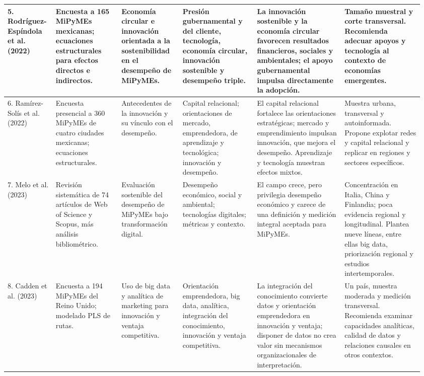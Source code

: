 \documentclass[spanish,letterpaper,oneside]{article}
\begin{document}
\begin{landscape}
\begin{longtable}{@{}p{0.105\linewidth}p{0.155\linewidth}p{0.145\linewidth}p{0.17\linewidth}p{0.205\linewidth}p{0.18\linewidth}@{}}
5. Rodríguez-Espíndola et al. (2022) & Encuesta a 165 MiPyMEs mexicanas; ecuaciones estructurales para efectos directos e indirectos. & Economía circular e innovación orientada a la sostenibilidad en el desempeño de MiPyMEs. & Presión gubernamental y del cliente, tecnología, economía circular, innovación sostenible y desempeño triple. & La innovación sostenible y la economía circular favorecen resultados financieros, sociales y ambientales; el apoyo gubernamental impulsa directamente la adopción. & Tamaño muestral y corte transversal. Recomienda adecuar apoyos y tecnología al contexto de economías emergentes. \\
\midrule
6. Ramírez-Solís et al. (2022) & Encuesta presencial a 360 MiPyMEs de cuatro ciudades mexicanas; ecuaciones estructurales. & Antecedentes de la innovación y su vínculo con el desempeño. & Capital relacional; orientaciones de mercado, emprendedora, de aprendizaje y tecnológica; innovación y desempeño. & El capital relacional fortalece las orientaciones estratégicas; mercado y emprendimiento impulsan innovación, que mejora el desempeño. Aprendizaje y tecnología muestran efectos mixtos. & Muestra urbana, transversal y autoinformada. Propone explotar redes y capital relacional y replicar en regiones y sectores específicos. \\
\midrule
7. Melo et al. (2023) & Revisión sistemática de 74 artículos de Web of Science y Scopus, más análisis bibliométrico. & Evaluación sostenible del desempeño de MiPyMEs bajo transformación digital. & Desempeño económico, social y ambiental; tecnologías digitales; métricas y contexto. & El campo crece, pero privilegia desempeño económico y carece de una definición y medición integral aceptada para MiPyMEs. & Concentración en Italia, China y Finlandia; poca evidencia regional y longitudinal. Plantea nueve líneas, entre ellas big data, priorización regional y estudios intertemporales. \\
\midrule
8. Cadden et al. (2023) & Encuesta a 194 MiPyMEs del Reino Unido; modelado PLS de rutas. & Uso de big data y analítica de marketing para innovación y ventaja competitiva. & Orientación emprendedora, big data, analítica, integración del conocimiento, innovación y ventaja competitiva. & La integración del conocimiento convierte datos y orientación emprendedora en innovación y ventaja; disponer de datos no crea valor sin mecanismos organizacionales de interpretación. & Un país, muestra moderada y medición transversal. Recomienda examinar capacidades analíticas, calidad de datos y relaciones causales en otros contextos. \\

\end{longtable}
\end{landscape}
\end{document}

